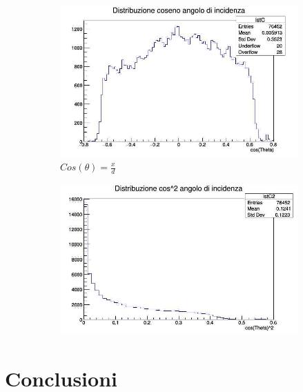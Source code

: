 \documentclass[a4paper]{article}
\begin{document}
\begin{figure}[H]
\begin{subfigure}[b]{0.4\textwidth}
\includegraphics[width=\textwidth]{./immagini/TimeOfFlight/DistrCos.jpg}
\caption{$Cos(\theta) = \frac{x}{d}$}
\label{fig:DistrCos}
\end{subfigure}
\hfill
\begin{subfigure}[b]{0.4\textwidth}
\includegraphics[width=\textwidth]{./immagini/TimeOfFlight/DistrCos2.jpg}
\caption{}
\label{fig:DistrCos2}
\end{subfigure}
\end{figure}

\section{Conclusioni}
\end{document}
